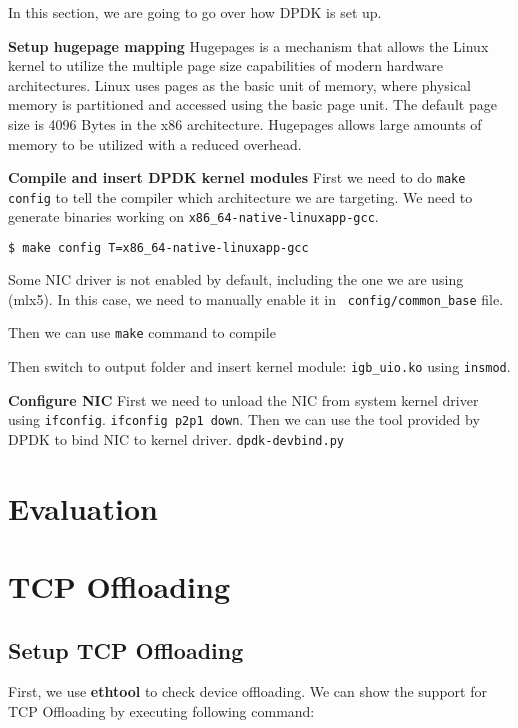 \documentclass[bsc,frontabs,twoside,singlespacing,parskip,deptreport]{infthesis}     %
\begin{document}
In this section, we are going to go over how DPDK is set up.


\textbf{Setup hugepage mapping} Hugepages is a mechanism that allows the Linux kernel to utilize the multiple page size capabilities of modern hardware architectures. Linux uses pages as the basic unit of memory, where physical memory is partitioned and accessed using the basic page unit. The default page size is 4096 Bytes in the x86 architecture. Hugepages allows large amounts of memory to be utilized with a reduced overhead.




\textbf{Compile and insert DPDK kernel modules} First we need to do \texttt{make config} to tell the compiler which architecture we are targeting. We need to generate binaries working on \texttt{x86\_64-native-linuxapp-gcc}. 

\begin{lstlisting}[language=bash]
  $ make config T=x86_64-native-linuxapp-gcc
\end{lstlisting}

Some NIC driver is not enabled by default, including the one we are using (mlx5). In this case, we need to manually enable it in \texttt{ config/common\_base} file.

Then we can use \texttt{make} command to compile



Then switch to output folder and insert kernel module: \texttt{igb\_uio.ko} using \texttt{insmod}.


\textbf{Configure NIC} First we need to unload the NIC from system kernel driver using \texttt{ifconfig}. \texttt{ifconfig p2p1 down}. Then we can use the tool provided by DPDK to bind NIC to kernel driver. \texttt{dpdk-devbind.py}




\chapter{Evaluation}




\chapter{TCP Offloading}

\section{Setup TCP Offloading}
First, we use \textbf{ethtool} to check device offloading. We can show the support for TCP Offloading by executing following command: 
\end{document}
